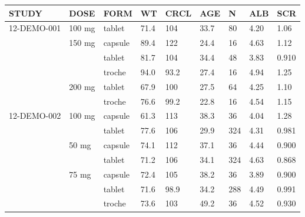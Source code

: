 {\def\arraystretch{1.4}\tabcolsep=5pt
\begin{threeparttable}
\begin{tabular}[h]{lllllllll}
\hline
STUDY & DOSE & FORM & WT & CRCL & AGE & N & ALB & SCR \\
\hline
12-DEMO-001 & 100 mg & tablet & 71.4 & 104 & 33.7 & 80 & 4.20 & 1.06 \\
 & 150 mg & capsule & 89.4 & 122 & 24.4 & 16 & 4.63 & 1.12 \\
 &  & tablet & 81.7 & 104 & 34.4 & 48 & 3.83 & 0.910 \\
 &  & troche & 94.0 & 93.2 & 27.4 & 16 & 4.94 & 1.25 \\
 & 200 mg & tablet & 67.9 & 100 & 27.5 & 64 & 4.25 & 1.10 \\
 &  & troche & 76.6 & 99.2 & 22.8 & 16 & 4.54 & 1.15 \\
12-DEMO-002 & 100 mg & capsule & 61.3 & 113 & 38.3 & 36 & 4.04 & 1.28 \\
 &  & tablet & 77.6 & 106 & 29.9 & 324 & 4.31 & 0.981 \\
 & 50 mg & capsule & 74.1 & 112 & 37.1 & 36 & 4.44 & 0.900 \\
 &  & tablet & 71.2 & 106 & 34.1 & 324 & 4.63 & 0.868 \\
 & 75 mg & capsule & 72.4 & 105 & 38.2 & 36 & 3.89 & 0.900 \\
 &  & tablet & 71.6 & 98.9 & 34.2 & 288 & 4.49 & 0.991 \\
 &  & troche & 73.6 & 103 & 49.2 & 36 & 4.52 & 0.930 \\
\hline
\end{tabular}
\end{threeparttable}
}
